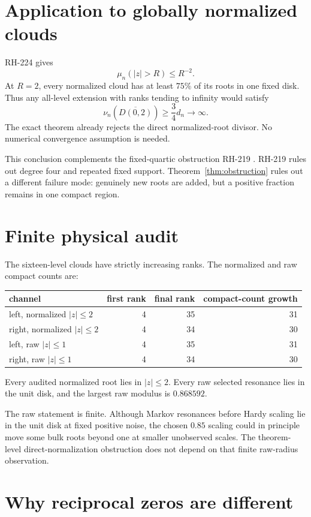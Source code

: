 \documentclass[11pt]{article}
\theoremstyle{remark}\newtheorem{remark}[theorem]{Remark}
\begin{document}
\section{Application to globally normalized clouds}

RH-224 gives
\[
 \mu_n(|z|>R)\le R^{-2}.
\]
At $R=2$, every normalized cloud has at least $75\%$ of its roots in one
fixed disk. Thus any all-level extension with ranks tending to infinity would
satisfy
\[
 \nu_n(\overline{D(0,2)})\ge\frac34d_n\to\infty.
\]
The exact theorem already rejects the direct normalized-root divisor. No
numerical convergence assumption is needed.

This conclusion complements the fixed-quartic obstruction RH-219
\citep{WangRH219}. RH-219 rules out degree four and repeated fixed support.
Theorem~\ref{thm:obstruction} rules out a different failure mode: genuinely
new roots are added, but a positive fraction remains in one compact region.

\section{Finite physical audit}

The sixteen-level clouds have strictly increasing ranks. The normalized and
raw compact counts are:
\begin{center}
\begin{tabular}{lrrr}
\toprule
channel & first rank & final rank & compact-count growth\\
\midrule
left, normalized $|z|\le2$ & 4 & 35 & 31\\
right, normalized $|z|\le2$ & 4 & 34 & 30\\
left, raw $|z|\le1$ & 4 & 35 & 31\\
right, raw $|z|\le1$ & 4 & 34 & 30\\
\bottomrule
\end{tabular}
\end{center}
Every audited normalized root lies in $|z|\le2$. Every raw selected resonance
lies in the unit disk, and the largest raw modulus is $0.868592$.

The raw statement is finite. Although Markov resonances before Hardy scaling
lie in the unit disk at fixed positive noise, the chosen $0.85$ scaling could
in principle move some bulk roots beyond one at smaller unobserved scales.
The theorem-level direct-normalization obstruction does not depend on that
finite raw-radius observation.

\section{Why reciprocal zeros are different}
\end{document}
